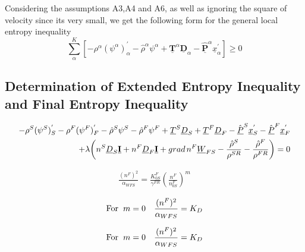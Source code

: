\documentclass[12pt]{article}
\begin{document}
Considering the assumptions A3,A4 and A6, as well as ignoring the square of velocity since its very small, we get the following form for the general local entropy inequality
\begin{equation}
	\boxed{{{\sum_{\alpha}^{{K}}}} \left[ {-\rho^\alpha}{(\psi^\alpha)_{\alpha}^{'}} - {\hat{\rho}^{\alpha}}{{\psi}^{\alpha}} + {{\underline{\mathbf{T}}}^{\alpha}}{{\underline{\mathbf{D}}}_{\alpha}} - {{\underline{\hat{\mathbf{P}}}}^{\alpha}}{\underline{x}_{\alpha}^{'}}                        \right] \geq 0 }
\end{equation}


\subsection{Determination of Extended Entropy Inequality and Final Entropy Inequality}

\begin{equation}
	\begin{aligned}
		-{\rho^{S}}{(\psi^{S})_{S}^{'}}-{\rho^{F}}{(\psi^{F})_{F}^{'}} - {\hat{\rho}^{S}}{\psi^{S}} - {\hat{\rho}^{F}}{\psi^{F}} + {\underline{T}^{S}}{\underline{D}_{S}} + {\underline{T}^{F}}{\underline{D}_{F}} - {\hat{\underline{P}}^{S}}{\underline{x}_{S}^{'}}-{\hat{\underline{P}}^{F}}{\underline{x}_{F}^{'}} \\+ \lambda{\left( {n^{S}}{\underline{D}_{S}}{\underline{\mathbf{I}}} +{n^{F}}{\underline{D}_{F}}{\underline{\mathbf{I}}}+{{grad}\hspace{0.5mm}{n^{F}}{\underline{W}_{FS}}} - \frac{\hat{\rho}^{S}}{\rho^{SR}} - \frac{\hat{\rho}^{F}}{\rho^{FR}}\right)} = 0
	\end{aligned}
\end{equation}

\begin{equation*}
	\begin{aligned}
		\frac{(n^{F})^2}{\alpha_{WFS}}={\frac{K_{0S}^{F}}{\gamma^{FR}}}{\left( {\frac{n^F}{n_{0S}^{F}}}\right)^{m}}
	\end{aligned}
\end{equation*}

\begin{equation*}
	\begin{aligned}
		\textrm{For}\hspace{2mm}{m=0}\quad\frac{(n^{F})^2}{\alpha_{WFS}}=K_{D}
	\end{aligned}
\end{equation*}

\begin{equation*}
	\begin{aligned}
		\textrm{For}\hspace{2mm}{m=0}\quad\frac{(n^{F})^2}{\alpha_{WFS}}=K_{D}
	\end{aligned}
\end{equation*}
\end{document}
